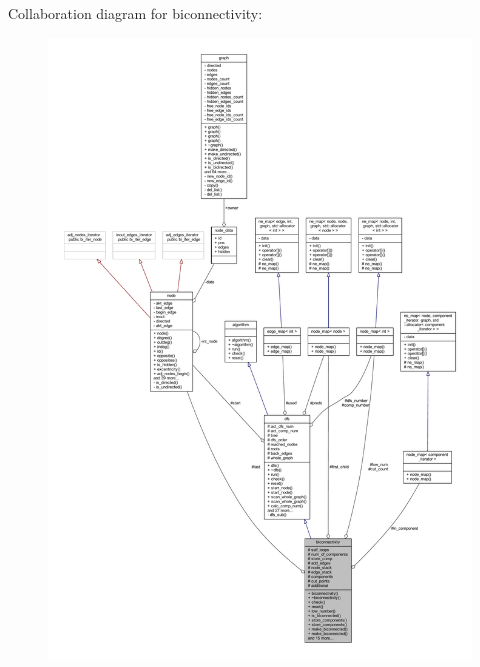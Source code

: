 Collaboration diagram for biconnectivity\+:\nopagebreak
\begin{figure}[H]
\begin{center}
\leavevmode
\includegraphics[width=350pt]{classbiconnectivity__coll__graph}
\end{center}
\end{figure}
